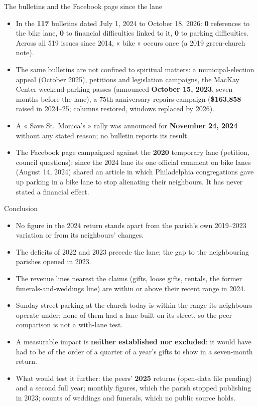 \documentclass[aspectratio=169,11pt]{beamer}
\newcommand{\B}[1]{\textbf{#1}}
\begin{document}
\begin{frame}{The bulletins and the Facebook page since the lane}
\begin{itemize}
\item In the \B{117} bulletins dated July 1, 2024 to October 18, 2026: \B{0} references to the bike lane, \B{0} to financial difficulties linked to it, \B{0} to parking difficulties. Across all 519 issues since 2014, « bike » occurs once (a 2019 green-church note).
\item The same bulletins are not confined to spiritual matters: a municipal-election appeal (October 2025), petitions and legislation campaigns, the MacKay Center weekend-parking passes (announced \B{October 15, 2023}, seven months before the lane), a 75th-anniversary repairs campaign (\B{\$163,858} raised in 2024--25; columns restored, windows replaced by 2026).
\item A « Save St.~Monica's » rally was announced for \B{November 24, 2024} without any stated reason; no bulletin reports its result.
\item The Facebook page campaigned against the \B{2020} temporary lane (petition, council questions); since the 2024 lane its one official comment on bike lanes (August 14, 2024) shared an article in which Philadelphia congregations gave up parking in a bike lane to stop alienating their neighbours. It has never stated a financial effect.
\end{itemize}
\end{frame}

\begin{frame}{Conclusion}
\begin{itemize}
\item No figure in the 2024 return stands apart from the parish's own 2019--2023 variation or from its neighbours' changes.
\item The deficits of 2022 and 2023 precede the lane; the gap to the neighbouring parishes opened in 2023.
\item The revenue lines nearest the claims (gifts, loose gifts, rentals, the former funerals-and-weddings line) are within or above their recent range in 2024.
\item Sunday street parking at the church today is within the range its neighbours operate under; none of them had a lane built on its street, so the peer comparison is not a with-lane test.
\item A measurable impact is \B{neither established nor excluded}: it would have had to be of the order of a quarter of a year's gifts to show in a seven-month return.
\item What would test it further: the peers' \B{2025} returns (open-data file pending) and a second full year; monthly figures, which the parish stopped publishing in 2023; counts of weddings and funerals, which no public source holds.
\end{itemize}
\end{frame}
\end{document}

